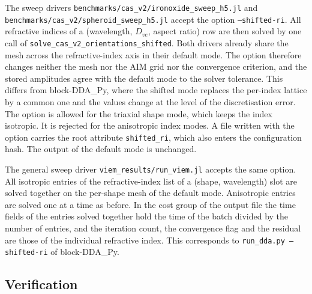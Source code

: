 \documentclass[11pt,a4paper]{article}
\begin{document}
\begin{sloppypar}
The sweep drivers
\nolinkurl{benchmarks/cas_v2/ironoxide_sweep_h5.jl} and
\nolinkurl{benchmarks/cas_v2/spheroid_sweep_h5.jl} accept the option
\texttt{--shifted-ri}.
All refractive indices of a (wavelength, $D_{ve}$, aspect ratio) row
are then solved by one call of
\texttt{solve\_cas\_v2\_orientations\_shifted}.
Both drivers already share the mesh across the refractive-index axis
in their default mode.
The option therefore changes neither the mesh nor the AIM grid nor the
convergence criterion, and the stored amplitudes agree with the default
mode to the solver tolerance.
This differs from block-DDA\_Py, where the shifted mode replaces the
per-index lattice by a common one and the values change at the level
of the discretisation error.
The option is allowed for the triaxial shape mode, which keeps the
index isotropic.
It is rejected for the anisotropic index modes.
A file written with the option carries the root attribute
\texttt{shifted\_ri}, which also enters the configuration hash.
The output of the default mode is unchanged.
\end{sloppypar}

\begin{sloppypar}
The general sweep driver \nolinkurl{viem_results/run_viem.jl} accepts
the same option.
All isotropic entries of the refractive-index list of a (shape,
wavelength) slot are solved together on the per-shape mesh of the
default mode.
Anisotropic entries are solved one at a time as before.
In the cost group of the output file the time fields of the entries
solved together hold the time of the batch divided by the number of
entries, and the iteration count, the convergence flag and the residual
are those of the individual refractive index.
This corresponds to \texttt{run\_dda.py --shifted-ri} of block-DDA\_Py.
\end{sloppypar}

\subsection{Verification}
\label{sec:shift-verification}
\end{document}
